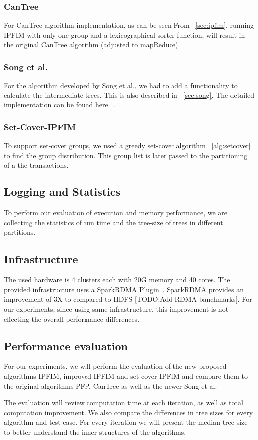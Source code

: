\subsubsection{CanTree}
For CanTree algorithm implementation, as can be seen From ~\ref{sec:ipfim}, running IPFIM with only one group and a lexicographical sorter function, will result in the original CanTree algorithm (adjusted to mapReduce).

\subsubsection{Song et al.}
For the algorithm developed by Song et al., we had to add a functionality to calculate the intermediate trees. This is also described in ~\ref{sec:song}. The detailed implementation can be found here ~\cite{songLevImplementation}.

\subsubsection{Set-Cover-IPFIM}
To support set-cover groups, we used a greedy set-cover algorithm ~\autoref{alg:setcover} to find the group distribution. This group list is later passed to the partitioning of a the transactions. 

\subsection{Logging and Statistics}
To perform our evaluation of execution and memory performance, we are collecting the statistics of run time and the tree-size of trees in different partitions.

\subsection{Infrastructure}
The used hardware is 4 clusters each with 20G memory and 40 cores. The provided infrastructure uses a SparkRDMA Plugin~\cite{SparkRDMA}. SparkRDMA provides an improvement of 3X to compared to HDFS [TODO:Add RDMA banchmarks]. For our experiments, since using same infrastructure, this improvement is not effecting the overall performance differences. 

\iffalse
This is however in our experiments, using the datasets as different files, while all experiments using same infrastructure, the comparison is valid.  Elaborate in a new section?
\fi

\subsection{Performance evaluation}
For our experiments, we will perform the evaluation of the new proposed algorithms IPFIM, improved-IPFIM and set-cover-IPFIM and compare them to the original algorithms PFP, CanTree as well as the newer Song et al.

The evaluation will review computation time at each iteration, as well as total computation improvement.  We also compare the differences in tree sizes for every algorithm and test case. For every iteration we will present the median tree size to better understand the inner structures of the algorithms. 
